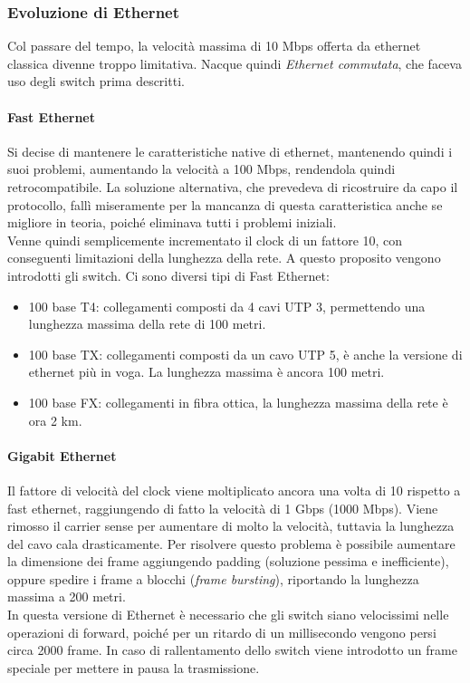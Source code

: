 \documentclass[10pt,a4paper,twoside]{article}
\begin{document}
\subsubsection{Evoluzione di Ethernet}
Col passare del tempo, la velocità massima di 10 Mbps offerta da ethernet classica divenne troppo limitativa. Nacque quindi \textit{Ethernet commutata}, che faceva uso degli switch prima descritti.
\paragraph{Fast Ethernet} Si decise di mantenere le caratteristiche native di ethernet, mantenendo quindi i suoi problemi, aumentando la velocità a 100 Mbps, rendendola quindi retrocompatibile. La soluzione alternativa, che prevedeva di ricostruire da capo il protocollo, fallì miseramente per la mancanza di questa caratteristica anche se migliore in teoria, poiché eliminava tutti i problemi iniziali.\\
Venne quindi semplicemente incrementato il clock di un fattore 10, con conseguenti limitazioni della lunghezza della rete. A questo proposito vengono introdotti gli switch. Ci sono diversi tipi di Fast Ethernet:
\begin{itemize}
\item 100 base T4: collegamenti composti da 4 cavi UTP 3, permettendo una lunghezza massima della rete di 100 metri.
\item 100 base TX: collegamenti composti da un cavo UTP 5, è anche la versione di ethernet più in voga. La lunghezza massima è ancora 100 metri.
\item 100 base FX: collegamenti in fibra ottica, la lunghezza massima della rete è ora 2 km.
\end{itemize}
\paragraph{Gigabit Ethernet} Il fattore di velocità del clock viene moltiplicato ancora una volta di 10 rispetto a fast ethernet, raggiungendo di fatto la velocità di 1 Gbps (1000 Mbps). Viene rimosso il carrier sense per aumentare di molto la velocità, tuttavia la lunghezza del cavo cala drasticamente. Per risolvere questo problema è possibile aumentare la dimensione dei frame aggiungendo padding (soluzione pessima e inefficiente), oppure spedire i frame a blocchi (\textit{frame bursting}), riportando la lunghezza massima a 200 metri.\\
In questa versione di Ethernet è necessario che gli switch siano velocissimi nelle operazioni di forward, poiché per un ritardo di un millisecondo vengono persi circa 2000 frame. In caso di rallentamento dello switch viene introdotto un frame speciale per mettere in pausa la trasmissione.
\end{document}
